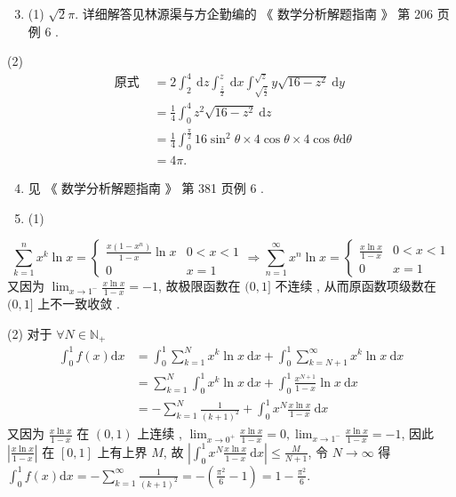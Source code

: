 \documentclass[10pt]{article}
\begin{document}
\begin{enumerate}
  \setcounter{enumi}{2}
  \item (1) $\sqrt{2} \pi$.  详细解答见林源渠与方企勤编的 《 数学分析解题指南 》 第  206  页例  6 .
\end{enumerate}
(2)
$$
\begin{aligned}
\text { 原式 } &=2 \int_{2}^{4} \mathrm{~d} z \int_{\frac{z}{2}}^{z} \mathrm{~d} x \int_{\sqrt{\frac{z}{2}}}^{\sqrt{z}} y \sqrt{16-z^{2}} \mathrm{~d} y \\
&=\frac{1}{4} \int_{0}^{4} z^{2} \sqrt{16-z^{2}} \mathrm{~d} z \\
&=\frac{1}{4} \int_{0}^{\frac{\pi}{2}} 16 \sin ^{2} \theta \times 4 \cos \theta \times 4 \cos \theta \mathrm{d} \theta \\
&=4 \pi .
\end{aligned}
$$

\begin{enumerate}
  \setcounter{enumi}{3}
  \item  见 《 数学分析解题指南 》 第  381  页例  6 .

  \item (1)

\end{enumerate}
$$
\sum_{k=1}^{n} x^{k} \ln x=\left\{\begin{array}{ll}
\frac{x\left(1-x^{n}\right)}{1-x} \ln x & 0<x<1 \\
0 & x=1
\end{array} \Longrightarrow \sum_{n=1}^{\infty} x^{n} \ln x= \begin{cases}\frac{x \ln x}{1-x} & 0<x<1 \\
0 & x=1\end{cases}\right.
$$
 又因为  $\lim _{x \rightarrow 1^{-}} \frac{x \ln x}{1-x}=-1$,  故极限函数在  $(0,1]$  不连续 ,  从而原函数项级数在  $(0,1]$  上不一致收敛 .

(2)  对于  $\forall N \in \mathbb{N}_{+}$
$$
\begin{aligned}
\int_{0}^{1} f(x) \mathrm{d} x &=\int_{0}^{1} \sum_{k=1}^{N} x^{k} \ln x \mathrm{~d} x+\int_{0}^{1} \sum_{k=N+1}^{\infty} x^{k} \ln x \mathrm{~d} x \\
&=\sum_{k=1}^{N} \int_{0}^{1} x^{k} \ln x \mathrm{~d} x+\int_{0}^{1} \frac{x^{N+1}}{1-x} \ln x \mathrm{~d} x \\
&=-\sum_{k=1}^{N} \frac{1}{(k+1)^{2}}+\int_{0}^{1} x^{N} \frac{x \ln x}{1-x} \mathrm{~d} x
\end{aligned}
$$
 又因为  $\frac{x \ln x}{1-x}$  在  $(0,1)$  上连续 , $\lim _{x \rightarrow 0^{+}} \frac{x \ln x}{1-x}=0, \lim _{x \rightarrow 1^{-}} \frac{x \ln x}{1-x}=-1$,  因此  $\left|\frac{x \ln x}{1-x}\right|$  在  $[0,1]$  上有上界  $M$,  故  $\left|\int_{0}^{1} x^{N} \frac{x \ln x}{1-x} \mathrm{~d} x\right| \leq \frac{M}{N+1}$,  令  $N \rightarrow \infty$  得  $\int_{0}^{1} f(x) \mathrm{d} x=-\sum_{k=1}^{\infty} \frac{1}{(k+1)^{2}}=-\left(\frac{\pi^{2}}{6}-1\right)=1-\frac{\pi^{2}}{6}$.
\end{document}
